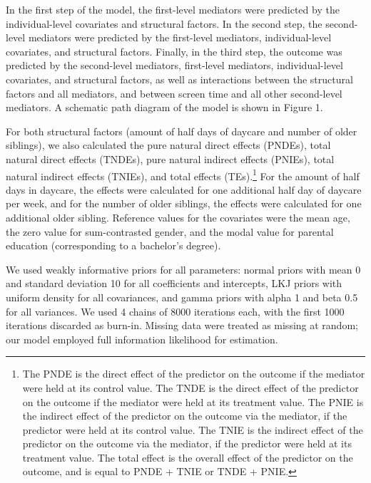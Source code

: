 \documentclass[
  man,
  floatsintext,
  longtable,
  nolmodern,
  notxfonts,
  notimes,
  colorlinks=true,linkcolor=blue,citecolor=blue,urlcolor=blue]{apa7}
\begin{document}
In the first step of the model, the first-level mediators were predicted
by the individual-level covariates and structural factors. In the second
step, the second-level mediators were predicted by the first-level
mediators, individual-level covariates, and structural factors. Finally,
in the third step, the outcome was predicted by the second-level
mediators, first-level mediators, individual-level covariates, and
structural factors, as well as interactions between the structural
factors and all mediators, and between screen time and all other
second-level mediators. A schematic path diagram of the model is shown
in Figure 1.

For both structural factors (amount of half days of daycare and number
of older siblings), we also calculated the pure natural direct effects
(PNDEs), total natural direct effects (TNDEs), pure natural indirect
effects (PNIEs), total natural indirect effects (TNIEs), and total
effects (TEs).\footnote{The PNDE is the direct effect of the predictor
  on the outcome if the mediator were held at its control value. The
  TNDE is the direct effect of the predictor on the outcome if the
  mediator were held at its treatment value. The PNIE is the indirect
  effect of the predictor on the outcome via the mediator, if the
  predictor were held at its control value. The TNIE is the indirect
  effect of the predictor on the outcome via the mediator, if the
  predictor were held at its treatment value. The total effect is the
  overall effect of the predictor on the outcome, and is equal to PNDE +
  TNIE or TNDE + PNIE.} For the amount of half days in daycare, the
effects were calculated for one additional half day of daycare per week,
and for the number of older siblings, the effects were calculated for
one additional older sibling. Reference values for the covariates were
the mean age, the zero value for sum-contrasted gender, and the modal
value for parental education (corresponding to a bachelor's degree).

We used weakly informative priors for all parameters: normal priors with
mean 0 and standard deviation 10 for all coeﬀicients and intercepts, LKJ
priors with uniform density for all covariances, and gamma priors with
alpha 1 and beta 0.5 for all variances. We used 4 chains of 8000
iterations each, with the first 1000 iterations discarded as burn-in.
Missing data were treated as missing at random; our model employed full
information likelihood for estimation.

\vspace{1em}
\end{document}

